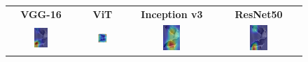 \documentclass[a4paper,12pt]{report}
\begin{document}
\begin{figure}[H]
    \centering
    \setlength{\tabcolsep}{1pt}
    \begin{tabular}{cccc}
    \textbf{VGG-16} & \textbf{ViT} & \textbf{Inception v3} & \textbf{ResNet50} \\
    
    \includegraphics[width=0.22\textwidth]{images/appendix/modelgraph/vgg/correct/Slaty_Backed_Gull/20241204_170322.jpg} &
    \includegraphics[width=0.22\textwidth]{images/appendix/modelgraph/vit/correct/Slaty_Backed_Gull/20241204_170322.jpg} &
    \includegraphics[width=0.22\textwidth]{images/appendix/modelgraph/inception/correct/Slaty_Backed_Gull/20241204_170322.jpg} &
    \includegraphics[width=0.22\textwidth]{images/appendix/modelgraph/resnet/correct/Slaty_Backed_Gull/20241204_170322.jpg} \\
    \end{tabular}

    \label{fig:interpretability_slaty_3}
\end{figure}
\end{document}
